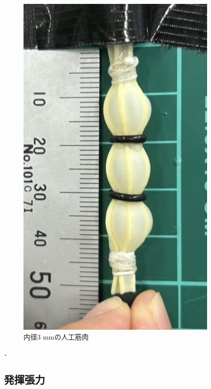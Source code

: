 \begin{figure}[h]
\begin{minipage}{0.49\columnwidth}
    \end{minipage}
    \begin{minipage}{0.49\columnwidth}
      \vspace{4mm}
      \centering
      \includegraphics[scale=0.3]{pic/L.jpg}
      
    \end{minipage}
    \caption{内径3 mmの人工筋肉}
    \label{fig:zA}
  \end{figure}．
\subsection{発揮張力}



